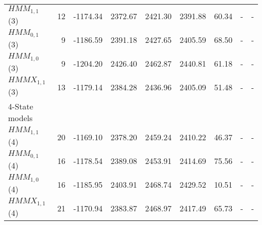 \documentclass[11pt,a4paper,oneside]{article}
\begin{document}
\begin{table}[h!]
\begin{tabular}{lrrrrrrrr}
\hspace{3mm}$HMM_{1,1}$(3) & 12 & -1174.34 & 2372.67 & 2421.30 & 2391.88 & 60.34 & - & -  \\

\hspace{3mm}$HMM_{0,1}$(3) & 9 & -1186.59 & 2391.18 & 2427.65 & 2405.59 & 68.50 & - & -  \\

\hspace{3mm}$HMM_{1,0}$(3) & 9 & -1204.20 & 2426.40 & 2462.87 & 2440.81 & 61.18 & - & -  \\

\hspace{3mm}$HMMX_{1,1}$(3)& 13 & -1179.14 & 2384.28 & 2436.96 & 2405.09 & 51.48 & - & -  \\

4-State models & & & & & & &  \\ 

\hspace{3mm}$HMM_{1,1}$(4) & 20 & -1169.10 & 2378.20 & 2459.24 & 2410.22 & 46.37 & - & - \\

\hspace{3mm}$HMM_{0,1}$(4) & 16 & -1178.54 & 2389.08 & 2453.91 & 2414.69 & 75.56 & - & - \\

\hspace{3mm}$HMM_{1,0}$(4) & 16 & -1185.95 & 2403.91 & 2468.74 & 2429.52 & 10.51 & - & - \\

\hspace{3mm}$HMMX_{1,1}$(4)& 21 & -1170.94 & 2383.87 & 2468.97 & 2417.49 & 65.73 & - & -  \\






\end{tabular}
\end{table}
\end{document}
